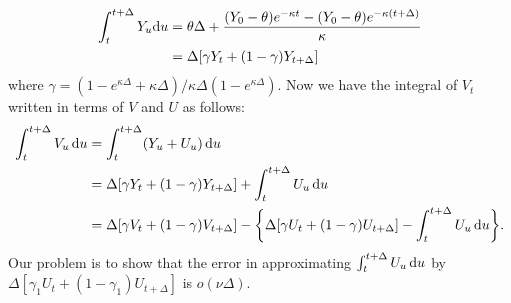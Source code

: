 \documentclass{ws-ijfe}
\begin{document}
\begin{align*}
   \int^{t+\Delta}_t Y_u\d u %
    & =\theta\Delta+\frac{(Y_0-\theta)e^{-\kappa t}-(Y_0-\theta)e^{-\kappa (t+\Delta)}}{\kappa}\\
    &= \Delta[\gamma Y_t+(1-\gamma)Y_{t+\Delta}]
  \end{align*}
where $\gamma = (1-e^{\kappa\Delta}+\kappa\Delta)\big/\kappa\Delta(1-e^{\kappa\Delta})$.
Now we have the integral of $V_t$ written in terms of $V$ and $U$ as follows:
\begin{equation}\label{intV_U}
\begin{split}
   \int_{t}^{t+\Delta}V_u\,\d u &= \int_{t}^{t+\Delta}(Y_u+U_u)\,\d u\\ &=\Delta[\gamma Y_t+(1-\gamma )Y_{t+\Delta}]+\int_{t}^{t+\Delta}U_u\,\d u\\
   &=\Delta[\gamma  V_t+(1-\gamma ) V_{t+\Delta}]-\bigg\{\Delta[\gamma  U_t+(1-\gamma ) U_{t+\Delta}]-\int_{t}^{t+\Delta}U_u\,\d u\bigg\}.
\end{split}
\end{equation}
Our problem is to show that the error in approximating $\int_{t}^{t+\Delta}U_u\,\mathrm{d} u$ by $\Delta[\gamma_1 U_t+(1-\gamma_1) U_{t+\Delta}]$ is $o(\nu\Delta)$.
\end{document}
